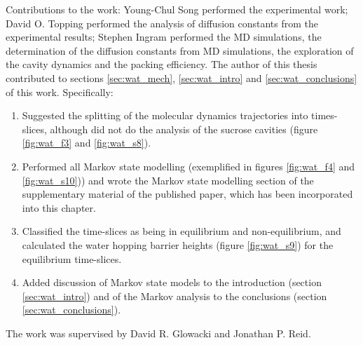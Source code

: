 Contributions to the work: Young-Chul Song performed the experimental work; David O. Topping performed the analysis of diffusion constants from the experimental results; Stephen Ingram performed the MD simulations, the determination of the diffusion constants from MD simulations, the exploration of the cavity dynamics and the packing efficiency. The author of this thesis contributed to sections \ref{sec:wat_mech}, \ref{sec:wat_intro} and \ref{sec:wat_conclusions} of this work. Specifically: 
\begin{enumerate}
    \item Suggested the splitting of the molecular dynamics trajectories into times-slices, although did not do the analysis of the sucrose cavities (figure \ref{fig:wat_f3} and \ref{fig:wat_s8}). 
    \item Performed all Markov state modelling (exemplified in figures \ref{fig:wat_f4} and \ref{fig:wat_s10})) and wrote the Markov state modelling section of the supplementary material of the published paper, which has been incorporated into this chapter. 
    \item Classified the time-slices as being in equilibrium and non-equilibrium, and calculated the water hopping barrier heights (figure \ref{fig:wat_s9}) for the equilibrium time-slices. 
    \item Added discussion of Markov state models to the introduction (section \ref{sec:wat_intro}) and of the Markov analysis to the conclusions (section \ref{sec:wat_conclusions}). 
\end{enumerate}
The work was supervised by David R. Glowacki and Jonathan P. Reid. 



